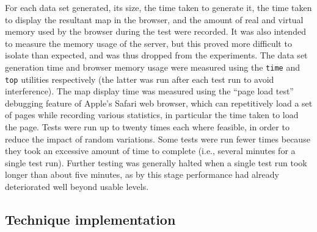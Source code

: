 \documentclass[acmnow]{acmtrans2m}
\begin{document}
For each data set generated, its size, the time taken to generate it,
the time taken to display the resultant map in the browser, and the
amount of real and virtual memory used by the browser during the test
were recorded. It was also intended to measure the memory usage of the
server, but this proved more difficult to isolate than expected, and was
thus dropped from the experiments. The data set generation time and
browser memory usage were measured using the \texttt{time} and
\texttt{top} utilities respectively (the latter was run after each test
run to avoid interference). The map display time was measured using the
``page load test'' debugging feature of Apple's Safari web browser,
which can repetitively load a set of pages while recording various
statistics, in particular the time taken to load the page. Tests were
run up to twenty times each where feasible, in order to reduce the
impact of random variations. Some tests were run fewer times because
they took an excessive amount of time to complete (i.e., several minutes
for a single test run). Further testing was generally halted when a
single test run took longer than about five minutes, as by this stage
performance had already deteriorated well beyond usable levels.


\subsection{Technique implementation}
\end{document}
